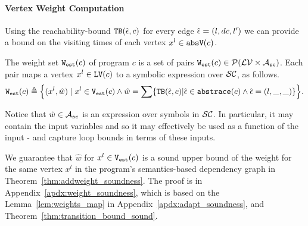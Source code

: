 \paragraph{Vertex Weight Computation}
Using the reachability-bound ${\mathtt{TB}}(\hat{\mathtt{\epsilon}{}}, c)$ for every edge $\hat{\mathtt{\epsilon}{}} = (l, dc, l')$ we can provide a bound on the visiting times of each vertex $x^l \in \mathtt{abs}{\mathtt{V}}(c)$.
\begin{defn}
 \label{def:adaptfun-weight}
The weight set $\mathtt{{W_{est}}}(c)$ of program $c$ is a set of pairs $\mathtt{{W_{est}}}(c) \in \mathcal{P}(\mathcal{LV} \times \mathcal{A}_{\mathtt{sc}})$.
Each pair maps
a vertex $x^l \in \mathtt{LV}(c)$ to a symbolic expression over $\mathcal{SC}$,
as follows.
 \[
 \progW(c) \triangleq
 \left\{ (x^l, \hat{w}) 
\mid
x^l \in \progV(c) 
\land 
\hat{w} = 
\sum\left\{ \absclr(\absevent, c) \middle\vert \absevent \in \absflow(c) \land \absevent = (l, \_, \_) \right\}
\right\}.
\]
\end{defn}
%
Notice that $\hat{w} \in \mathcal{A}_{\mathtt{sc}}$ is an expression over symbols in $\mathcal{SC}$. In particular, it may contain the input variables and so it may effectively be used as a function of the input - and capture loop bounds in terms of these inputs.
 
We guarantee that $\hat{w}$ for $x^l \in \mathtt{{V_{est}}}(c)$ is a sound upper bound of 
the weight for the same vertex $x^l$ in the program's semantics-based dependency graph
in Theorem~\ref{thm:addweight_soundness}.
The proof is in Appendix~\ref{apdx:weight_soundness}, which is based on the Lemma~\ref{lem:weights_map}
in Appendix~\ref{apdx:adapt_soundness}, and Theorem~\ref{thm:transition_bound_sound}.

